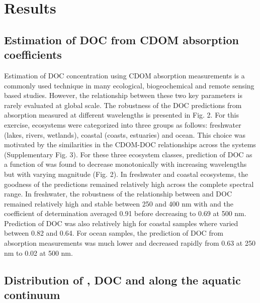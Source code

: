 
\section*{Results}
\label{sec:Results}

\subsection*{Estimation of DOC from CDOM absorption coefficients}

Estimation of DOC concentration using CDOM absorption measurements is a commonly used technique in many ecological, biogeochemical and remote sensing based studies. However, the relationship between these two key parameters is rarely evaluated at global scale. The robustness of the DOC predictions from absorption measured at different wavelengths is presented in Fig. 2. For this exercise, ecosystems were categorized into three groups as follows: freshwater (lakes, rivers, wetlands), coastal (coasts, estuaries) and ocean. This choice was motivated by the similarities in the CDOM-DOC relationships across the systems (Supplementary Fig. 3). For these three ecosystem classes, prediction of DOC as a function of \acdom{\lambda} was found to decrease monotonically with increasing wavelengths but with varying magnitude (Fig. 2). In freshwater and coastal ecosystems, the goodness of the predictions remained relatively high across the complete spectral range. In freshwater, the robustness of the relationship between \acdom{\lambda} and DOC remained relatively high and stable between 250 and 400 nm with and the coefficient of determination averaged 0.91 before decreasing to 0.69 at 500 nm. Prediction of DOC was also relatively high for coastal samples where \rr varied between 0.82 and 0.64. For ocean samples, the prediction of DOC from absorption measurements was much lower and \rr decreased rapidly from 0.63 at 250 nm to 0.02 at 500 nm.

\subsection*{Distribution of , DOC and  along the aquatic continuum}

